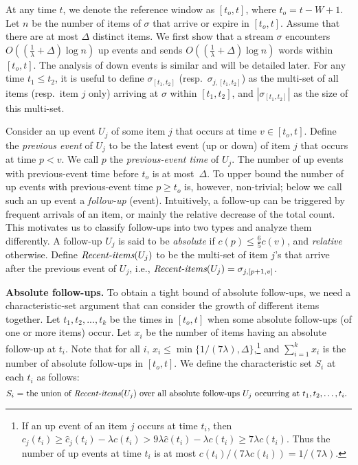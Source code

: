\documentclass[proceedings]{stacs}
\theoremstyle{definition}\newtheorem{fact}{Fact}
\newcommand{\ri}{\mbox{\it Recent-items}}
\newcommand{\ns}{c}
\newcommand{\hns}{\hat c}
\newcommand{\cjs}{c_{j}}
\newcommand{\hcjs}{\hat c_{j}}
\begin{document}
\vspace{.5ex}
At any time $t$, we denote the reference window as
$[t_o, t]$, where $t_o = t-W + 1$.
 {Let $n$ be the number of items of $\sigma$ that
arrive or expire in $[t_o, t]$.}
Assume that there are at most $\Delta$ distinct items.
We first show that a stream $\sigma$ encounters
$O((\frac{1}{\lambda} + \Delta) \log n)$ up events
and sends $O((\frac{1}{\lambda} + \Delta) \log n)$ words
within $[t_o,t]$.  The analysis of down events is similar and will
be detailed later. For any time $t_1 \le t_2$,
it is useful to define $\sigma_{[t_1,t_2]}$
(resp.\ $\sigma_{j,[t_1,t_2]}$)
as the multi-set of all items (resp.\ item $j$ only)
arriving at $\sigma$ within $[t_1,t_2]$, and $|\sigma_{[t_1,t_2]}|$
as the size of this multi-set.


Consider an up event $U_j$ of some item $j$
that occurs at time $v \in [t_o, t]$.
Define the {\em previous event} of $U_j$ to be
the latest event (up or down) of item $j$
that occurs at time $p < v$.
We call $p$ the \emph{previous-event time} of $U_j$.
The number of up events
with previous-event time before $t_o$
is at most~$\Delta$.
To upper bound the number of
up events with previous-event time $p \ge t_o$
is, however, non-trivial;
below we call such an up event a \emph{follow-up} (event).
Intuitively, a follow-up can be triggered by
frequent arrivals of an item, or mainly
the relative decrease of the total count.
This motivates us to classify follow-ups
into two types and analyze them differently.
A follow-up $U_j$ is said to be {\em absolute} if
$\ns(p) \le \frac{6}{5} \ns(v)$, and {\em relative} otherwise.
Define $\ri(U_j)$ to be
the multi-set of item $j$'s that arrive after the
previous event of $U_j$, i.e., $\ri(U_j) = \sigma_{j,[p+1, v]}$.

\vspace{.5ex}
{\bf Absolute follow-ups.}
To obtain a tight bound of absolute follow-ups, we need
a characteristic-set argument that can
consider the growth of different items together.
Let $t_1, t_2, ..., t_k$ be the times in $[t_o, t]$
when some absolute follow-ups (of one or more items) occur.
Let $x_i$ be the number of items having an absolute follow-up at $t_i$.
Note that for all $i$, $x_i \le \min\{1 / (7 \lambda), \Delta\}$,\footnote{
  If an up event of an item $j$ occurs at time $t_i$,
  then $\cjs(t_i) \ge \hcjs(t_i) - \lambda \ns(t_i)
  > 9 \lambda \hns(t_i) - \lambda \ns(t_i) \ge 7 \lambda \ns(t_i)$.
  Thus the number of up events at time $t_i$ is at most
  $\ns(t_i) / (7 \lambda \ns(t_i)) = 1/ (7\lambda)$.
}  and $\sum_{i=1}^{k} x_i$ is the number of absolute follow-ups in $[t_o, t]$.
We define the characteristic set $S_i$ at each $t_i$ as follows:
$$\mbox{$S_i$ = the union of
$\ri(U_j)$ over all absolute follow-ups $U_j$ occurring at $t_1, t_2, \dots, t_i$.
}
$$
\end{document}

